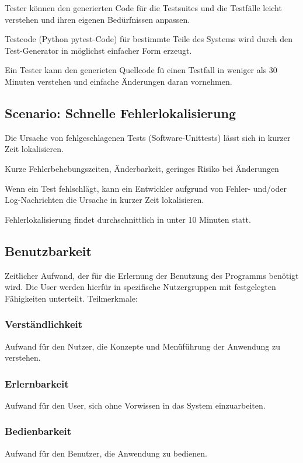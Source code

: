 \documentclass[
	ngerman,
	toc=listof, %
	toc=bibliography, %
	footnotes=multiple, %
	parskip=half, %
	numbers=noendperiod %
]{scrartcl}
\begin{document}
				Tester können den generierten Code für die Testsuites und die Testfälle leicht verstehen und ihren eigenen Bedürfnissen anpassen.

				Testcode (Python pytest-Code) für bestimmte Teile des Systems wird durch den Test-Generator in möglichst einfacher Form erzeugt.

				Ein Tester kann den generieten Quellcode fü einen Testfall in weniger als 30 Minuten verstehen und einfache Änderungen daran vornehmen.

		\subsection{Scenario: Schnelle Fehlerlokalisierung}
			Die Ursache von fehlgeschlagenen Tests (Software-Unittests) lässt sich in kurzer Zeit lokalisieren.

				Kurze Fehlerbehebungszeiten, Änderbarkeit, geringes Risiko bei Änderungen

				Wenn ein Test fehlschlägt, kann ein Entwickler aufgrund von Fehler- und/oder Log-Nachrichten die Ursache in kurzer Zeit lokalisieren.

				Fehlerlokalisierung findet durchschnittlich in unter 10 Minuten statt.
	
	\subsection{Benutzbarkeit}
		Zeitlicher Aufwand, der für die Erlernung der Benutzung des Programms benötigt wird. Die User werden hierfür in spezifische Nutzergruppen mit festgelegten Fähigkeiten unterteilt.
		Teilmerkmale:
		
		\subsubsection{Verständlichkeit}
			Aufwand für den Nutzer, die Konzepte und Menüführung der Anwendung zu verstehen.

		\subsubsection{Erlernbarkeit}
			Aufwand für den User, sich ohne Vorwissen in das System einzuarbeiten.

		\subsubsection{Bedienbarkeit}
			Aufwand für den Benutzer, die Anwendung zu bedienen.
\end{document}
